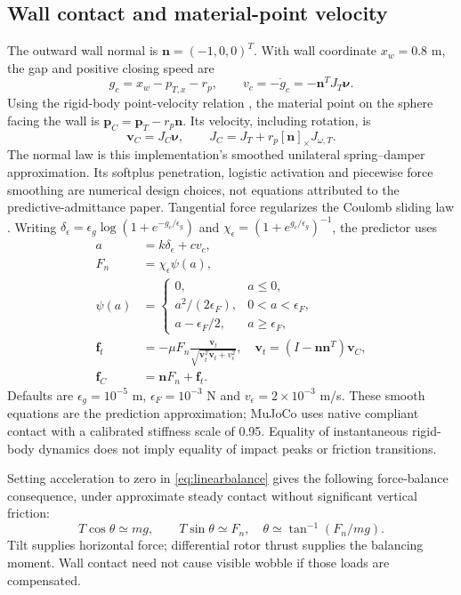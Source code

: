 \documentclass[conference]{IEEEtran}
\newcommand{\crossmat}[1]{[#1]_\times}
\begin{document}
\subsection{Wall contact and material-point velocity}
The outward wall normal is $\mathbf n=(-1,0,0)^T$. With wall coordinate $x_w=0.8$ m, the gap and positive closing speed are
\begin{equation}
g_c=x_w-p_{T,x}-r_p,\qquad v_c=-\dot g_c=-\mathbf n^T J_T\boldsymbol\nu.
\end{equation}
Using the rigid-body point-velocity relation \cite[ch.~3]{lynch2017}, the material point on the sphere facing the wall is $\mathbf p_C=\mathbf p_T-r_p\mathbf n$. Its velocity, including rotation, is
\begin{equation}
\mathbf v_C=J_C\boldsymbol\nu,\qquad J_C=J_T+r_p\crossmat{\mathbf n}J_{\omega,T}.
\end{equation}
The normal law is this implementation's smoothed unilateral spring--damper approximation. Its softplus penetration, logistic activation and piecewise force smoothing are numerical design choices, not equations attributed to the predictive-admittance paper. Tangential force regularizes the Coulomb sliding law \cite[Sec.~12.2.1]{lynch2017}. Writing $\delta_\epsilon=\epsilon_g\log(1+e^{-g_c/\epsilon_g})$ and $\chi_\epsilon=(1+e^{g_c/\epsilon_g})^{-1}$, the predictor uses
\begin{align}
a&=k\delta_\epsilon+c v_c,\\
F_n&=\chi_\epsilon\psi(a),\label{eq:contact}\\
\psi(a)&=\begin{cases}0,&a\leq0,\\a^2/(2\epsilon_F),&0<a<\epsilon_F,\\a-\epsilon_F/2,&a\geq\epsilon_F,\end{cases}\\
\mathbf f_t&=-\mu F_n\frac{\mathbf v_t}{\sqrt{\mathbf v_t^T\mathbf v_t+v_\epsilon^2}},\quad
\mathbf v_t=(I-\mathbf n\mathbf n^T)\mathbf v_C,\\
\mathbf f_C&=\mathbf nF_n+\mathbf f_t.
\end{align}
Defaults are $\epsilon_g=10^{-5}$ m, $\epsilon_F=10^{-3}$ N and $v_\epsilon=2\times10^{-3}$ m/s. These smooth equations are the prediction approximation; MuJoCo uses native compliant contact with a calibrated stiffness scale of 0.95. Equality of instantaneous rigid-body dynamics does not imply equality of impact peaks or friction transitions.

Setting acceleration to zero in \eqref{eq:linearbalance} gives the following force-balance consequence, under approximate steady contact without significant vertical friction:
\begin{equation}
T\cos\theta\simeq mg,\qquad T\sin\theta\simeq F_n,
\quad \theta\simeq\tan^{-1}(F_n/mg).
\label{eq:tilt}
\end{equation}
Tilt supplies horizontal force; differential rotor thrust supplies the balancing moment. Wall contact need not cause visible wobble if those loads are compensated.
\end{document}
